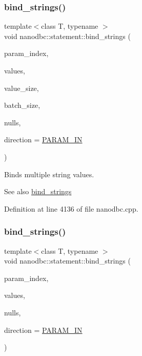 \subsubsection{\texorpdfstring{bind\_strings()}{bind\_strings()}\hspace{0.1cm}{\footnotesize\ttfamily [7/9]}}
{\footnotesize\ttfamily template$<$class T, typename $>$ \\
void nanodbc\+::statement\+::bind\+\_\+strings (\begin{DoxyParamCaption}\item[{short}]{param\+\_\+index,  }\item[{T const $\ast$}]{values,  }\item[{std\+::size\+\_\+t}]{value\+\_\+size,  }\item[{std\+::size\+\_\+t}]{batch\+\_\+size,  }\item[{bool const $\ast$}]{nulls,  }\item[{\mbox{\hyperlink{classnanodbc_1_1statement_a523142f53cbbee8d68a074da993e7fa6}{param\+\_\+direction}}}]{direction = {\ttfamily \mbox{\hyperlink{classnanodbc_1_1statement_a523142f53cbbee8d68a074da993e7fa6ae33f42ce0677d00c291ff4d8e39f99de}{P\+A\+R\+A\+M\+\_\+\+IN}}} }\end{DoxyParamCaption})}



Binds multiple string values. 

\begin{DoxySeeAlso}{See also}
\mbox{\hyperlink{group__bind__strings_ga8914c229f28ee7b02cf1b85684741326}{bind\+\_\+strings}} 
\end{DoxySeeAlso}


Definition at line 4136 of file nanodbc.\+cpp.

\mbox{\label{group__bind__strings_ga7cc7255e38df32cedd8e50f86512a9a8}} 
\subsubsection{\texorpdfstring{bind\_strings()}{bind\_strings()}\hspace{0.1cm}{\footnotesize\ttfamily [8/9]}}
{\footnotesize\ttfamily template$<$class T, typename $>$ \\
void nanodbc\+::statement\+::bind\+\_\+strings (\begin{DoxyParamCaption}\item[{short}]{param\+\_\+index,  }\item[{std\+::vector$<$ T $>$ const \&}]{values,  }\item[{bool const $\ast$}]{nulls,  }\item[{\mbox{\hyperlink{classnanodbc_1_1statement_a523142f53cbbee8d68a074da993e7fa6}{param\+\_\+direction}}}]{direction = {\ttfamily \mbox{\hyperlink{classnanodbc_1_1statement_a523142f53cbbee8d68a074da993e7fa6ae33f42ce0677d00c291ff4d8e39f99de}{P\+A\+R\+A\+M\+\_\+\+IN}}} }\end{DoxyParamCaption})}



